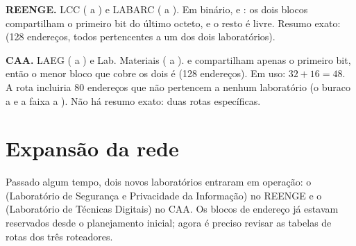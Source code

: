 \documentclass[11pt,a4paper]{article}
\begin{document}
\begin{gabarito}
\textbf{REENGE.} LCC ( a ) e LABARC ( a ). Em binário,  e : os dois blocos compartilham o primeiro bit do último octeto, e o resto é livre. Resumo exato:  (128 endereços, todos pertencentes a um dos dois laboratórios).

\textbf{CAA.} LAEG ( a ) e Lab. Materiais ( a ).  e  compartilham apenas o primeiro bit, então o menor bloco que cobre os dois é  (128 endereços). Em uso: $32 + 16 = 48$. A rota incluiria 80 endereços que não pertencem a nenhum laboratório (o buraco  a  e a faixa  a ). Não há resumo exato: duas rotas específicas.
\end{gabarito}

\section{Expansão da rede}

Passado algum tempo, dois novos laboratórios entraram em operação: o  (Laboratório de Segurança e Privacidade da Informação) no REENGE e o  (Laboratório de Técnicas Digitais) no CAA. Os blocos de endereço já estavam reservados desde o planejamento inicial; agora é preciso revisar as tabelas de rotas dos três roteadores.
\end{document}
